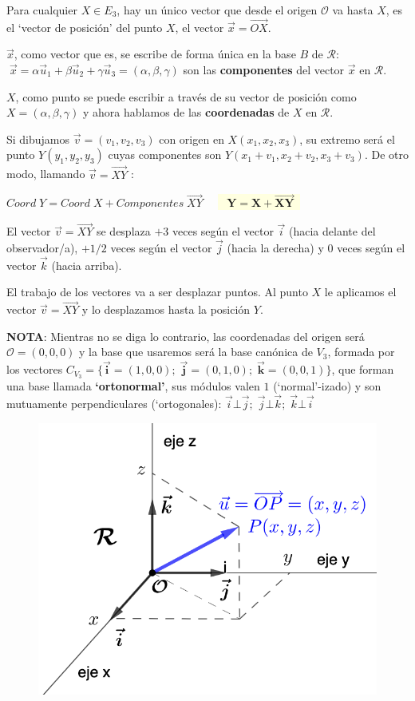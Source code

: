 \begin{defi}
\begin{multicols}{2}
Para cualquier $X\in E_3$, hay un único vector que desde el origen $\mathcal O$ va hasta $X$, es el `vector de posición' del punto $X$, el vector $\vec x=\overrightarrow{OX}$.

$\vec x$, como vector que es, se escribe de forma única en la base $B$ de $\mathcal R$: $\; \vec x=\alpha \vec u_1 + \beta \vec u_2+ \gamma \vec u_3=(\alpha, \beta, \gamma)$ son las \textbf{componentes} del vector $\vec x$ en $\mathcal R$.
\end{multicols} 

$X$, como punto se puede escribir a través de su vector de posición como $X=(\alpha, \beta, \gamma)$ y ahora hablamos de las \textbf{coordenadas} de $X$ en $\mathcal R$.

\end{defi}


Si dibujamos $\vec v=(v_1,v_2,v_3)$ con origen en $X(x_1,x_2,x_3)$, su extremo será el punto $Y(y_1,y_2,y_3)$ cuyas componentes son $Y(x_1+v_1,x_2+v_2,x_3+v_3)$. De otro modo, llamando $\vec v=\overrightarrow{XY}$ :

$Coord\; Y= Coord\; X + Componentes \; \overrightarrow{XY} \quad $
\colorbox{LightYellow}{$\;\boxed{ \;\boldsymbol{\;Y=X+\overrightarrow{XY}\;\; }} $}

El vector $\vec v=\overrightarrow{XY}$ se desplaza $+3$ veces según el vector $\vec i$ (hacia delante del observador/a), $+1/2$  veces según el vector $\vec j$ (hacia la derecha) y $0$ veces según el vector $\vec k$ (hacia arriba). 

El trabajo de los vectores va a ser desplazar puntos. Al punto $X$ le aplicamos el vector $\vec v=\overrightarrow{XY}$ y lo desplazamos hasta la posición $Y$.



\begin{multicols}{2}
\noindent \textbf{NOTA}: Mientras no se diga lo contrario, las coordenadas del origen será $\mathcal O=(0,0,0)$ y la base que usaremos será la base canónica de $V_3$, formada por los vectores $C_{V_3}=\{\boldsymbol{\vec i}=(1,0,0);\;\boldsymbol{\vec j}=(0,1,0);\;\boldsymbol{\vec k}=(0,0,1)\}$, que forman una base llamada \textbf{`ortonormal'}, sus módulos valen $1$ (`normal'-izado) y son mutuamente perpendiculares (`ortogonales): $\vec i \bot \vec j; \; \vec j \bot \vec k; \; \vec k \bot \vec i$

	\begin{figure}[H]
	\centering
	\includegraphics[width=.5\textwidth]{imagenes/imagenes09/T09IM07.png}
	\end{figure}
\end{multicols}

